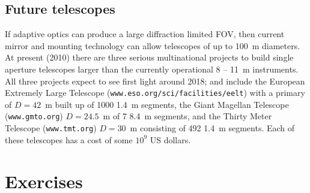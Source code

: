 \subsection{Future telescopes}

If adaptive optics can produce a large diffraction limited FOV, then current mirror and
mounting technology can allow telescopes of up to 100~m diameters. At present (2010)
there are three serious multinational projects to build single aperture telescopes larger 
than the currently operational 8 -- 11~m instruments. All three projects expect to see 
first light around 2018; and include the European Extremely Large Telescope 
({\tt www.eso.org/sci/facilities/eelt}) with a 
primary of $D=42$~m built up of 1000 1.4~m segments, the Giant Magellan Telescope
({\tt www.gmto.org})
$D=24.5$~m of 7 8.4~m segments, and the Thirty Meter Telescope 
({\tt www.tmt.org})
$D=30$~m consisting of 492 1.4~m segments. Each of these telescopes has a cost of
some $10^9$ US dollars.

\section{Exercises}

